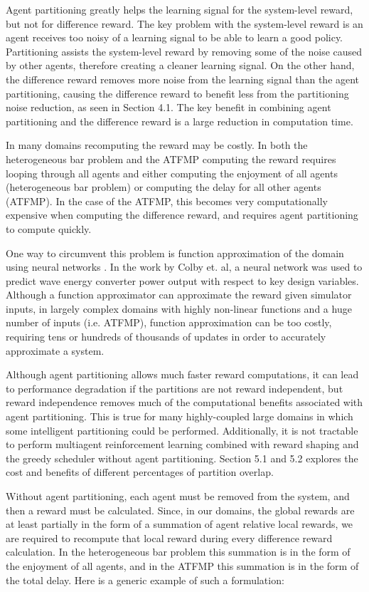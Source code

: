 \documentclass[onehalf,11pt]{beavtex}
\begin{document}
Agent partitioning greatly helps the learning signal for the system-level reward, but not for difference reward. The key problem with the system-level reward is an agent receives too noisy of a learning signal to be able to learn a good policy. Partitioning assists the system-level reward by removing some of the noise caused by other agents, therefore creating a cleaner learning signal. On the other hand, the difference reward removes more noise from the learning signal than the agent partitioning, causing the difference reward to benefit less from the partitioning noise reduction, as seen in Section 4.1. The key benefit in combining agent partitioning and the difference reward is a large reduction in computation time. 

In many domains recomputing the reward may be costly. In both the heterogeneous bar problem and the ATFMP computing the reward requires looping through all agents and either computing the enjoyment of all agents (heterogeneous bar problem) or computing the delay for all other agents (ATFMP). In the case of the ATFMP, this becomes very computationally expensive when computing the difference reward, and requires agent partitioning to compute quickly.

One way to circumvent this problem is function approximation of the domain using neural networks \cite{tumer-colby_gecco11}. In the work by Colby et. al, a neural network was used to predict wave energy converter power output with respect to key design variables. Although a function approximator can approximate the reward given simulator inputs, in largely complex domains with highly non-linear functions and a huge number of inputs (i.e. ATFMP), function approximation can be too costly, requiring tens or hundreds of thousands of updates in order to accurately approximate a system.

Although agent partitioning allows much faster reward computations, it can lead to performance degradation if the partitions are not reward independent, but reward independence removes much of the computational benefits associated with agent partitioning. This is true for many highly-coupled large domains in which some intelligent partitioning could be performed. Additionally, it is not tractable to perform multiagent reinforcement learning combined with reward shaping and the greedy scheduler without agent partitioning. Section 5.1 and 5.2 explores the cost and benefits of different percentages of partition overlap.

Without agent partitioning, each agent must be removed from the system, and then a reward must be calculated. Since, in our domains, the global rewards are at least partially in the form of a summation of agent relative local rewards, we are required to recompute that local reward during every difference reward calculation. In the heterogeneous bar problem this summation is in the form of the enjoyment of all agents, and in the ATFMP this summation is in the form of the total delay. Here is a generic example of such a formulation:
\end{document}
